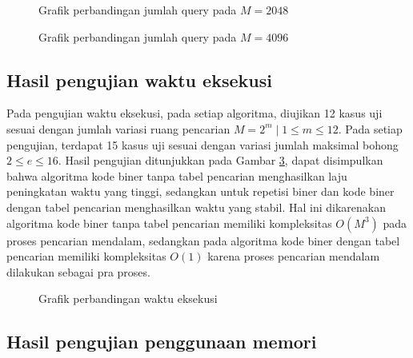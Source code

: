 \begin{figure}
\centering
{}
\caption{Grafik perbandingan jumlah query pada $M=2048$}
\label{fig:graph_query11}
\end{figure}

\begin{figure}
\centering
{}
\caption{Grafik perbandingan jumlah query pada $M=4096$}
\label{fig:graph_query12}
\end{figure}


\subsection{Hasil pengujian waktu eksekusi}

Pada pengujian waktu eksekusi, pada setiap algoritma, diujikan 12 kasus uji sesuai dengan jumlah variasi ruang pencarian $M = 2^m \mid 1 \leq m \leq 12$. Pada setiap pengujian, terdapat 15 kasus uji sesuai dengan variasi jumlah maksimal bohong $2 \leq e \leq 16$. Hasil pengujian ditunjukkan pada Gambar \ref{fig:graph_time}, dapat disimpulkan bahwa algoritma kode biner tanpa tabel pencarian menghasilkan laju peningkatan waktu yang tinggi, sedangkan untuk repetisi biner dan kode biner dengan tabel pencarian menghasilkan waktu yang stabil. Hal ini dikarenakan algoritma kode biner tanpa tabel pencarian memiliki kompleksitas $O(M^3)$ pada proses pencarian mendalam, sedangkan pada algoritma kode biner dengan tabel pencarian memiliki kompleksitas $O(1)$ karena proses pencarian mendalam dilakukan sebagai pra proses.

\begin{figure}
\centering
{}
\caption{Grafik perbandingan waktu eksekusi}
\label{fig:graph_time}
\end{figure}


\subsection{Hasil pengujian penggunaan memori}

